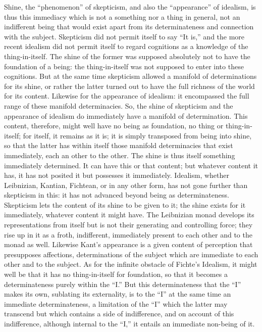 Shine, the “phenomenon” of skepticism,
and also the “appearance” of idealism,
is thus this immediacy which is not
a something nor a thing in general,
not an indifferent being that would exist apart
from its determinateness and connection with the subject.
Skepticism did not permit itself to say “It is,”
and the more recent idealism did not permit itself
to regard cognitions as a knowledge of the thing-in-itself.
The shine of the former was supposed absolutely
not to have the foundation of a being:
the thing-in-itself was not supposed
to enter into these cognitions.
But at the same time skepticism allowed
a manifold of determinations for its shine,
or rather the latter turned out to have
the full richness of the world for its content.
Likewise for the appearance of idealism:
it encompassed the full range of these manifold determinacies.
So, the shine of skepticism and the appearance of idealism
do immediately have a manifold of determination.
This content, therefore, might well have no being as foundation,
no thing or thing-in-itself;
for itself, it remains as it is;
it is simply transposed from being into shine,
so that the latter has within itself those manifold
determinacies that exist immediately,
each an other to the other.
The shine is thus itself something immediately determined.
It can have this or that content;
but whatever content it has, it has not posited it
but possesses it immediately.
Idealism, whether Leibnizian, Kantian, Fichtean, or in any
other form, has not gone further than skepticism in this:
it has not advanced beyond being as determinateness.
Skepticism lets the content of its shine to be given to it;
the shine exists for it immediately,
whatever content it might have.
The Leibnizian monad develops its representations from itself
but is not their generating and controlling force;
they rise up in it as a froth, indifferent,
immediately present to each other and to the monad as well.
Likewise Kant's appearance is a given content of perception
that presupposes affections, determinations of the subject
which are immediate to each other and to the subject.
As for the infinite obstacle of Fichte's Idealism,
it might well be that it has no thing-in-itself for foundation,
so that it becomes a determinateness purely within the “I.”
But this determinateness that the “I” makes its own,
sublating its externality,
is to the “I” at the same time an immediate determinateness,
a limitation of the “I” which the latter may transcend
but which contains a side of indifference,
and on account of this indifference,
although internal to the “I,”
it entails an immediate non-being of it.

